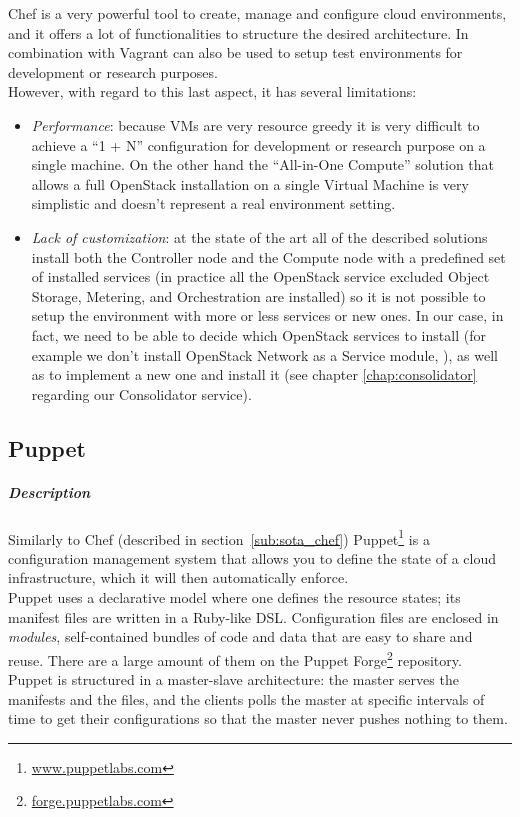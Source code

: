 Chef is a very powerful tool to create, manage and configure cloud environments, and it offers a lot of functionalities to structure the desired architecture. In combination with Vagrant can also be used to setup test environments for development or research purposes.\\
However, with regard to this last aspect, it has several limitations:
\begin{itemize}
\item \textit{Performance}: because VMs are very resource greedy it is very difficult to achieve a ``1 + N'' configuration for development or research purpose on a single machine. On the other hand the ``All-in-One Compute'' solution that allows a full OpenStack installation on a single Virtual Machine is very simplistic and doesn't represent a real environment setting.
\item \textit{Lack of customization}: at the state of the art all of the described solutions install both the Controller node and the Compute node with a predefined set of installed services (in practice all the OpenStack service excluded Object Storage, Metering, and Orchestration are installed) so it is not possible to setup the environment with more or less services or new ones. In our case, in fact, we need to be able to decide which OpenStack services to install (for example we don't install OpenStack Network as a Service module, ), as well as to implement a new one and install it (see chapter \ref{chap:consolidator} regarding our Consolidator service).
\end{itemize}




\subsection{Puppet}
\label{sub:sota_puppet}

\subparagraph{Description}
\label{subp:sota_puppet_desc}

Similarly to Chef (described in section~\ref{sub:sota_chef}) Puppet\footnote{\url{www.puppetlabs.com}} is a configuration management system that allows you to define the state of a cloud infrastructure, which it will then automatically enforce.\\
Puppet uses a declarative model where one defines the resource states; its manifest files are written in a Ruby-like DSL. Configuration files are enclosed in \textit{modules}, self-contained bundles of code and data that are easy to share and reuse. There are a large amount of them on the Puppet Forge\footnote{\url{forge.puppetlabs.com}} repository.\\
Puppet is structured in a master-slave architecture: the master serves the manifests and the files, and the clients polls the master at specific intervals of time to get their configurations so that the master never pushes nothing to them.


